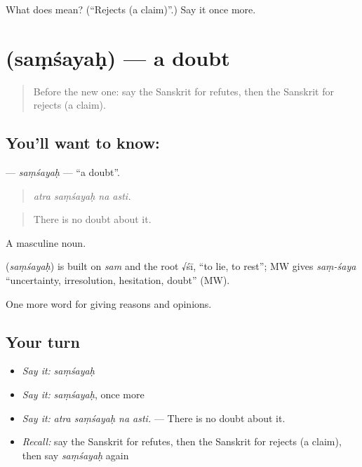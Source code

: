 \begin{tcolorbox}[breakable,colback=teal!4,colframe=teal!35!black,title={Before you move on}]
What does  mean? (\textquotedblleft{}Rejects (a claim)\textquotedblright{}.) Say it once more.
\end{tcolorbox}
\section[\texorpdfstring{\sk{संशयः} (saṃśayaḥ)}{संशयः (saṃśayaḥ)}]{ (saṃśayaḥ) — a doubt}

\label{lesson:SA-C346-samsayah}



\begin{quote}
Before the new one: say the Sanskrit for refutes, then the Sanskrit for rejects (a claim).
\end{quote}

\subsection*{You'll want to know: }
\textbf{} — \emph{saṃśayaḥ} — \textquotedblleft{}a doubt\textquotedblright{}.

\begin{quote}
   
\end{quote}

\begin{quote}
\emph{atra saṃśayaḥ na asti.}
\end{quote}

\begin{quote}
There is no doubt about it.
\end{quote}

A masculine noun.

\begin{cousinweb}
\textbf{} (\emph{saṃśayaḥ}) is built on \emph{sam} and the root √śī, \textquotedblleft{}to lie, to rest\textquotedblright{}; MW gives \emph{saṃ-śaya} \textquotedblleft{}uncertainty, irresolution, hesitation, doubt\textquotedblright{} (MW).
\end{cousinweb}

\begin{grammarlens}[title={What you've built}]
One more word for giving reasons and opinions.
\end{grammarlens}

\subsection*{Your turn}
\begin{itemize}
\raggedright
  \item \emph{Say it:} \emph{saṃśayaḥ}
  \item \emph{Say it:} \emph{saṃśayaḥ}, once more
  \item \emph{Say it:} \emph{atra saṃśayaḥ na asti.} — There is no doubt about it.
  \item \emph{Recall:} say the Sanskrit for refutes, then the Sanskrit for rejects (a claim), then say \emph{saṃśayaḥ} again
\end{itemize}


